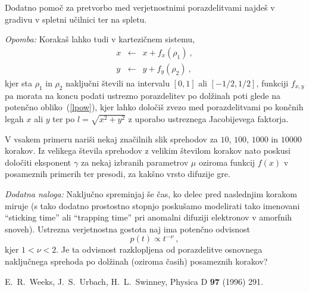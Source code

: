 \documentclass[slovene,11pt,a4paper]{article}
\begin{document}
Dodatno pomoč za pretvorbo
med verjetnostnimi porazdelitvami najdeš v gradivu v spletni učilnici 
ter na spletu. 

{\sl Opomba:} Korakaš lahko tudi v kartezičnem sistemu,
\begin{eqnarray*}
x &\leftarrow& x + f_x(\rho_1) \>, \\
y &\leftarrow& y + f_y(\rho_2) \>,
\end{eqnarray*}
kjer sta $\rho_1$ in $\rho_2$ naključni števili na intervalu $[0,1]$
ali $[-1/2,1/2]$, funkciji $f_{x,y}$ pa morata na koncu podati ustrezno 
porazdelitev po dolžinah poti glede na potenčno obliko~(\ref{lpow}), kjer 
lahko določiš zvezo med porazdelitvami po končnih legah $x$ ali $y$ ter  
po $l=\sqrt{x^2+y^2}$ z uporabo ustreznega Jacobijevega faktorja.

V vsakem primeru nariši nekaj značilnih
slik sprehodov za $10$, $100$, $1000$ in $10000$ korakov.
Iz velikega števila sprehodov z velikim številom korakov
nato poskusi določiti eksponent $\gamma$ za nekaj izbranih
parametrov $\mu$ oziroma funkcij $f(x)$ v posameznih primerih
ter presodi, za kakšno vrsto difuzije gre.

\bigskip
{\sl Dodatna naloga:} Naključno spreminjaj še čas,
ko delec pred naslednjim korakom miruje (s tako dodatno
prostostno stopnjo poskušamo modelirati tako imenovani
``sticking time'' ali ``trapping time'' pri anomalni difuziji
elektronov v amorfnih snoveh).  Ustrezna verjetnostna gostota
naj ima potenčno odvisnost
$$
p(t) \propto t^{-\nu} \>,
$$
kjer $1 < \nu < 2$.  Je ta odvisnost razklopljena od porazdelitve
osnovnega naključnega sprehoda po dolžinah (oziroma časih)
posameznih korakov?


\begin{thebibliography}{99}
\setlength{\itemsep}{.2\itemsep}\setlength{\parsep}{.5\parsep}
 E.~R.~Weeks, J.~S.~Urbach, H.~L.~Swinney, Physica D {\bf 97} (1996) 291.
\end{thebibliography}
\end{document}
